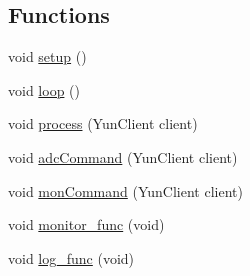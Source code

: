 \subsection*{Functions}
\begin{DoxyCompactItemize}
\item 
void \hyperlink{Yun__Log__BatteryDisCharging_8ino_a4fc01d736fe50cf5b977f755b675f11d}{setup} ()
\item 
void \hyperlink{Yun__Log__BatteryDisCharging_8ino_afe461d27b9c48d5921c00d521181f12f}{loop} ()
\item 
void \hyperlink{Yun__Log__BatteryDisCharging_8ino_a2f2962579c73a294710a4407f4d01452}{process} (Yun\-Client client)
\item 
void \hyperlink{Yun__Log__BatteryDisCharging_8ino_a47af6e3cf5c5124bab2fc8a806de9346}{adc\-Command} (Yun\-Client client)
\item 
void \hyperlink{Yun__Log__BatteryDisCharging_8ino_a643b2b76b312836a5e085dde7aca6cad}{mon\-Command} (Yun\-Client client)
\item 
void \hyperlink{Yun__Log__BatteryDisCharging_8ino_a28fbe287664dae075541dac88b510aa6}{monitor\-\_\-func} (void)
\item 
void \hyperlink{Yun__Log__BatteryDisCharging_8ino_a8f5fcd1f255d3f1b8071f4dd749ba418}{log\-\_\-func} (void)
\end{DoxyCompactItemize}
